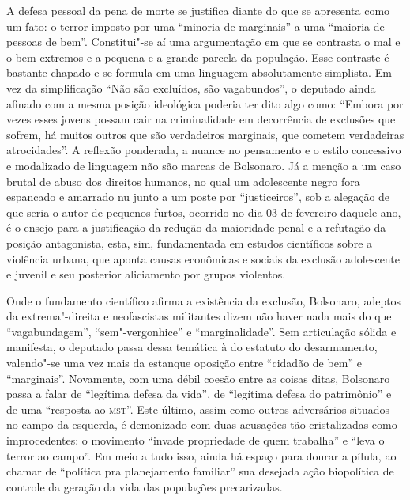 A defesa pessoal da pena de morte se justifica diante do que se
apresenta como um fato: o terror imposto por uma ``minoria de
marginais'' a uma ``maioria de pessoas de bem''. Constitui"-se aí uma
argumentação em que se contrasta o mal e o bem extremos e a pequena e a
grande parcela da população. Esse contraste é bastante chapado e se
formula em uma linguagem absolutamente simplista. Em vez da
simplificação ``Não são excluídos, são vagabundos'', o deputado ainda
afinado com a mesma posição ideológica poderia ter dito algo como:
``Embora por vezes esses jovens possam cair na criminalidade em
decorrência de exclusões que sofrem, há muitos outros que são
verdadeiros marginais, que cometem verdadeiras atrocidades''. A reflexão
ponderada, a nuance no pensamento e o estilo concessivo e modalizado de
linguagem não são marcas de Bolsonaro. Já a menção a um caso brutal de
abuso dos direitos humanos, no qual um adolescente negro fora espancado
e amarrado nu junto a um poste por ``justiceiros'', sob a alegação de
que seria o autor de pequenos furtos, ocorrido no dia 03 de fevereiro
daquele ano, é o ensejo para a justificação da redução da maioridade
penal e a refutação da posição antagonista, esta, sim, fundamentada em
estudos científicos sobre a violência urbana, que aponta causas
econômicas e sociais da exclusão adolescente e juvenil e seu posterior
aliciamento por grupos violentos.

Onde o fundamento científico afirma a existência da exclusão, Bolsonaro,
adeptos da extrema"-direita e neofascistas militantes dizem não haver
nada mais do que ``vagabundagem'', ``sem"-vergonhice'' e
``marginalidade''. Sem articulação sólida e manifesta, o deputado passa
dessa temática à do estatuto do desarmamento, valendo"-se uma vez mais da
estanque oposição entre ``cidadão de bem'' e ``marginais''. Novamente,
com uma débil coesão entre as coisas ditas, Bolsonaro passa a falar de
``legítima defesa da vida'', de ``legítima defesa do patrimônio'' e de
uma ``resposta ao \textsc{mst}''. Este último, assim como outros adversários
situados no campo da esquerda, é demonizado com duas acusações tão
cristalizadas como improcedentes: o movimento ``invade propriedade de
quem trabalha'' e ``leva o terror ao campo''. Em meio a tudo isso, ainda
há espaço para dourar a pílula, ao chamar de ``política pra planejamento
familiar'' sua desejada ação biopolítica de controle da geração da vida
das populações precarizadas.

